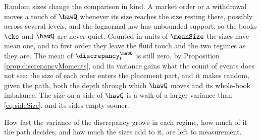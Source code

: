 Random sizes change the comparison in kind.
A market order or a withdrawal moves a touch of $\hawQ$
whenever its size reaches the size resting there,
possibly across several levels,
and the lognormal law has unbounded support,
so the books $\cks$ and $\hawQ$ are never quiet.
Counted in units of $\meanSize$ the sizes have mean one,
and to first order they leave the fluid touch and the two regimes as they are.
The mean of $\discrepancy^{\hawQ}_t$ is still zero, by Proposition \ref{prop.discrepancyMoments},
and its variance gains what the count of events does not see:
the size of each order enters the placement part,
and it makes random, given the path,
both the depth through which $\hawQ$ moves and its whole-book imbalance.
The size on a side of $\hawQ$ is a walk of a larger variance than \eqref{eq.sideSize},
and its sides empty sooner.

How fast the variance of the discrepancy grows in each regime,
how much of it the path decides,
and how much the sizes add to it,
are left to measurement.
